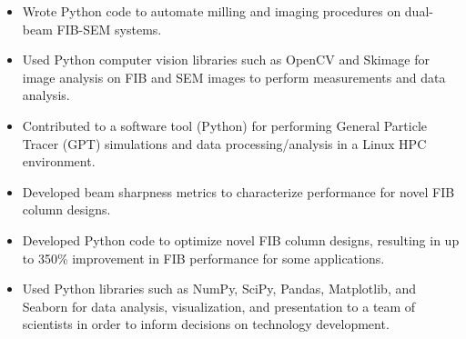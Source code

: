 \documentclass[letterpaper,10.8pt]{article}
\begin{document}
    \begin{itemize}[leftmargin=*,label={$\diamond$}]
    \itemsep0em %
    
    	\item {Wrote Python code to automate milling and imaging procedures on dual-beam FIB-SEM systems.}
	
	\item {Used Python computer vision libraries such as OpenCV and Skimage for image analysis on FIB and SEM images to perform measurements and data analysis.}
	
	\item {Contributed to a software tool (Python) for performing General Particle Tracer (GPT) simulations and data processing/analysis in a Linux HPC environment.}
	
	\item{Developed beam sharpness metrics to characterize performance for novel FIB column designs.}
	
	\item {Developed Python code to optimize novel FIB column designs, resulting in up to 350\% improvement in FIB performance for some applications.}
	
	\item {Used Python libraries such as NumPy, SciPy, Pandas, Matplotlib, and Seaborn for data analysis, visualization, and presentation to a team of scientists in order to inform decisions on technology development.}
	
	\end{itemize} %
      
\end{document}
